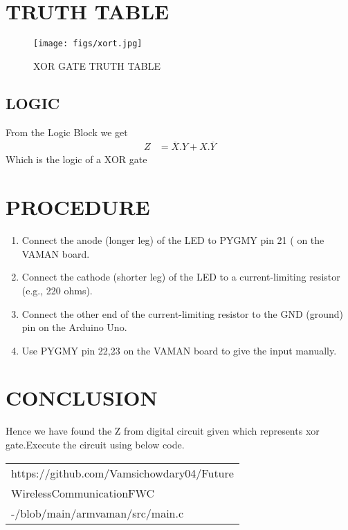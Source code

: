 \documentclass[journal,12pt,twocolumn]{IEEEtran}
\begin{document}
\section{TRUTH TABLE}
\begin{figure}[H]
\centering
\texttt{[image: figs/xort.jpg]}
\caption{XOR GATE TRUTH TABLE}
\label{fig:xort.png}
\end{figure}

\subsection{LOGIC}
From the Logic Block  we get
\begin{align}
  Z&=\overline{X}.Y+X.\overline{Y}
\end{align}
Which is the logic of a XOR gate 

\section{PROCEDURE}
\begin{enumerate}
\item Connect the anode (longer leg) of the LED to PYGMY pin 21 ( on the VAMAN board.
\item Connect the cathode (shorter leg) of the LED to a current-limiting resistor (e.g., 220 ohms).
\item Connect the other end of the current-limiting resistor to the GND (ground) pin on the Arduino Uno.
\item Use PYGMY pin 22,23 on the VAMAN board to give the input manually.
\end{enumerate}

\section{CONCLUSION}
Hence we have found the Z from  digital circuit given which represents xor gate.Execute the circuit using below code.

   \begin{tabularx}{0.46\textwidth} { 
  | >{\centering\arraybackslash}X |}
  \hline
https://github.com/Vamsichowdary04/Future\\\-Wireless\-Communication\-FWC\\-/blob/main/armvaman/src/main.c\\
  \hline
\end{tabularx}


\end{document}
